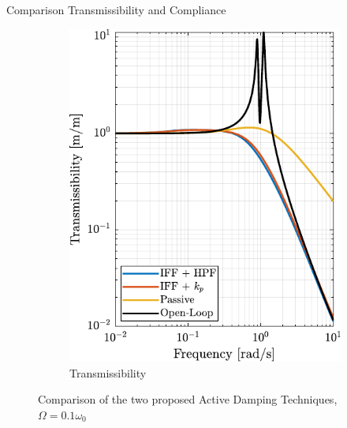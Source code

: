 \documentclass[t, minted]{clean-beamer}
\begin{document}
\begin{frame}[label={sec:orgdd42828}]{Comparison Transmissibility and Compliance}
\begin{figure}[htbp]
\begin{subfigure}[c]{0.49\linewidth}
\includegraphics[width=\linewidth]{figs/comp_transmissibility.pdf}
\caption{\label{fig:comp_transmissibility} Transmissibility}
\end{subfigure}
\hfill
\caption{Comparison of the two proposed Active Damping Techniques, \(\Omega = 0.1 \omega_0\)}
\centering
\end{figure}
\end{frame}
\end{document}
